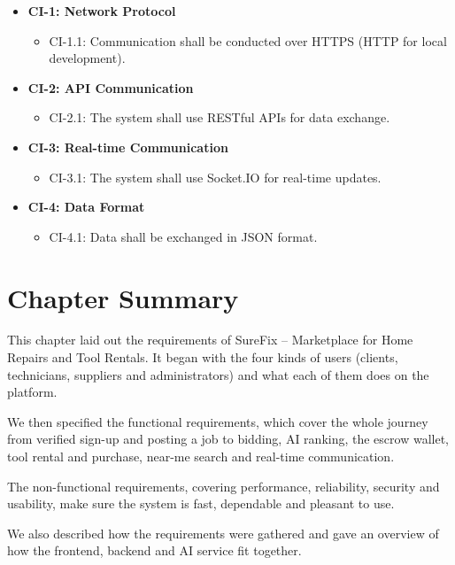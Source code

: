 \documentclass[A4paper,12pt]{report}
\theoremstyle{plain}
\theoremstyle{definition}
\theoremstyle{remark}
\numberwithin{equation}{section}
\begin{document}
\begin{itemize}
    \item \textbf{CI-1: Network Protocol}  
    \begin{itemize}
                \item CI-1.1: Communication shall be conducted over HTTPS (HTTP for local development).
    \end{itemize}

    \item \textbf{CI-2: API Communication}  
    \begin{itemize}
        \item CI-2.1: The system shall use RESTful APIs for data exchange.
    \end{itemize}

    \item \textbf{CI-3: Real-time Communication}  
    \begin{itemize}
        \item CI-3.1: The system shall use Socket.IO for real-time updates.
    \end{itemize}

    \item \textbf{CI-4: Data Format}  
    \begin{itemize}
        \item CI-4.1: Data shall be exchanged in JSON format.
    \end{itemize}
\end{itemize}
\pagebreak
\section{Chapter Summary}

This chapter laid out the requirements of SureFix – Marketplace for Home Repairs and Tool Rentals. It began with the four kinds of users (clients, technicians, suppliers and administrators) and what each of them does on the platform.

We then specified the functional requirements, which cover the whole journey from verified sign-up and posting a job to bidding, AI ranking, the escrow wallet, tool rental and purchase, near-me search and real-time communication.

The non-functional requirements, covering performance, reliability, security and usability, make sure the system is fast, dependable and pleasant to use.

We also described how the requirements were gathered and gave an overview of how the frontend, backend and AI service fit together.
\end{document}
